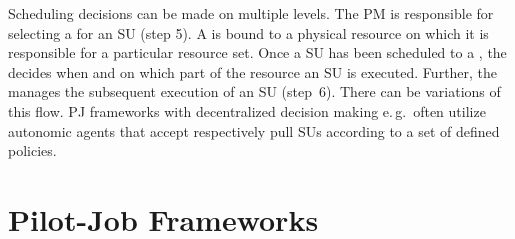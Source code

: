 \documentclass{sig-alternate}
\begin{document}
Scheduling decisions can be made on multiple levels. The PM is responsible for
selecting a \pilot for an SU (step 5). A \pilot is bound to a physical resource
on which it is responsible for a particular resource set. Once a SU has been
scheduled to a \pilot, the \pilot decides when and on which part of the resource
an SU is executed.
Further, the \pilot manages the subsequent execution of an SU (step~6).
There can be variations of this flow. 
PJ frameworks with decentralized decision making e.\,g.\ often utilize autonomic 
agents that accept respectively pull SUs according to a set of defined policies.

\section{Pilot-Job Frameworks}
\label{sec:pilot-job-frameworks}

\end{document}
